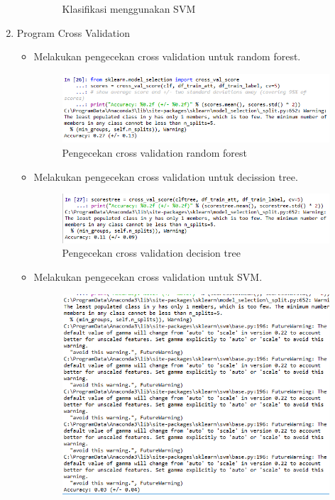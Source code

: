 \begin{enumerate}
\begin{enumerate}
\begin{figure}[ht]
				\caption{Klasifikasi menggunakan SVM}
				\label{contoh}
				\end{figure}
	\end{enumerate}
\item Program Cross Validation
	\begin{itemize}
		\item Melakukan pengecekan cross validation untuk random forest.
			\begin{figure}[ht]
			\centering
			\includegraphics[scale=0.5]{figures/AIP/ai32.PNG}
			\caption{Pengecekan cross validation random forest}
			\label{contoh}
			\end{figure}
		\item Melakukan pengecekan cross validation untuk decission tree.
			\begin{figure}[ht]
			\centering
			\includegraphics[scale=0.5]{figures/AIP/ai33.PNG}
			\caption{Pengecekan cross validation decision tree}
			\label{contoh}
			\end{figure}
		\item Melakukan pengecekan cross validation untuk SVM.
			\begin{figure}[ht]
			\centering
			\includegraphics[scale=0.5]{figures/AIP/ai34.PNG}

\end{figure}
\end{itemize}
\end{enumerate}
